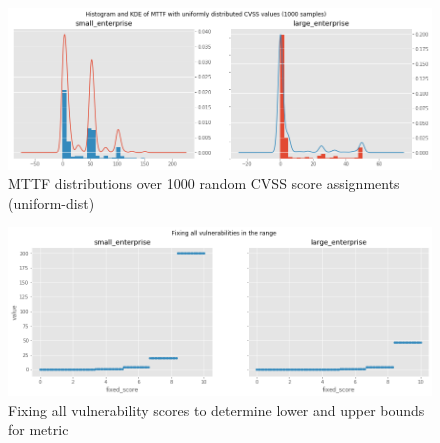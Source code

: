 \begin{figure}[ht]
       \centering
        \includegraphics[width=\linewidth]{resource/img/ch_automation/from_ares_paper/hist_kde_svl.png} 
        \caption{MTTF distributions over 1000 random CVSS score assignments (uniform-dist)\cite{Dacier_1994}} 
        \label{fig:mttf_score_distributions}
\end{figure}

\begin{figure}[ht]
       \centering
        \includegraphics[width=\linewidth]{resource/img/ch_automation/from_ares_paper/fixed_100.png} 
        \caption{Fixing all vulnerability scores to determine lower and upper bounds for metric}     \label{fig:score_map_stepping}
\end{figure}






